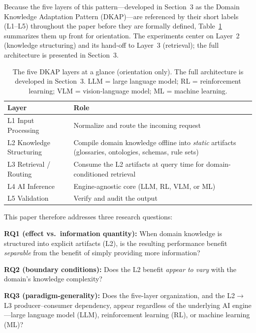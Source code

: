 \documentclass[fleqn,10pt,lineno]{wlpeerj}
\begin{document}
Because the five layers of this pattern---developed in Section~3 as the Domain Knowledge Adaptation Pattern (DKAP)---are referenced by their short labels (L1--L5) throughout the paper before they are formally defined, Table~\ref{tab:layers_glance} summarizes them up front for orientation. The experiments center on Layer~2 (knowledge structuring) and its hand-off to Layer~3 (retrieval); the full architecture is presented in Section~3.

\begin{table}[H]
\centering
\caption{The five DKAP layers at a glance (orientation only). The full architecture is developed in Section~3. LLM = large language model; RL = reinforcement learning; VLM = vision-language model; ML = machine learning.}
\label{tab:layers_glance}
\footnotesize
\begin{tabularx}{\columnwidth}{@{}lX@{}}
\toprule
\textbf{Layer} & \textbf{Role} \\
\midrule
L1 Input Processing & Normalize and route the incoming request \\
L2 Knowledge Structuring & Compile domain knowledge offline into \textit{static} artifacts (glossaries, ontologies, schemas, rule sets) \\
L3 Retrieval / Routing & Consume the L2 artifacts at query time for domain-conditioned retrieval \\
L4 AI Inference & Engine-agnostic core (LLM, RL, VLM, or ML) \\
L5 Validation & Verify and audit the output \\
\bottomrule
\end{tabularx}
\end{table}

This paper therefore addresses three research questions:

\noindent\textbf{RQ1 (effect vs.\ information quantity):} When domain knowledge is structured into explicit artifacts (L2), is the resulting performance benefit \textit{separable} from the benefit of simply providing more information?

\noindent\textbf{RQ2 (boundary conditions):} Does the L2 benefit \textit{appear to vary} with the domain's knowledge complexity?

\noindent\textbf{RQ3 (paradigm-generality):} Does the five-layer organization, and the L2$\rightarrow$L3 producer--consumer dependency, appear regardless of the underlying AI engine---large language model (LLM), reinforcement learning (RL), or machine learning (ML)?
\end{document}
